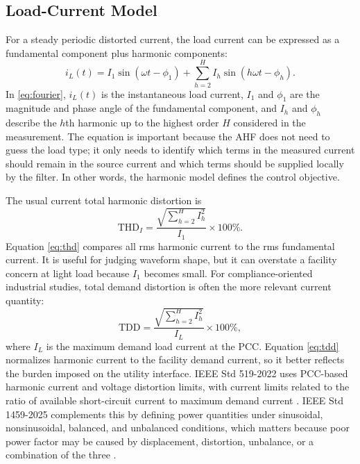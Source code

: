 \documentclass[conference]{IEEEtran}
\newcommand{\THD}{\mathrm{THD}}
\newcommand{\TDD}{\mathrm{TDD}}
\begin{document}
\subsection{Load-Current Model}
For a steady periodic distorted current, the load current can be expressed as a fundamental component plus harmonic components:
\begin{equation}
i_L(t)=I_1\sin(\omega t-\phi_1)+\sum_{h=2}^{H} I_h\sin(h\omega t-\phi_h).
\label{eq:fourier}
\end{equation}
In \eqref{eq:fourier}, $i_L(t)$ is the instantaneous load current, $I_1$ and $\phi_1$ are the magnitude and phase angle of the fundamental component, and $I_h$ and $\phi_h$ describe the $h$th harmonic up to the highest order $H$ considered in the measurement. The equation is important because the AHF does not need to guess the load type; it only needs to identify which terms in the measured current should remain in the source current and which terms should be supplied locally by the filter. In other words, the harmonic model defines the control objective.

The usual current total harmonic distortion is
\begin{equation}
\THD_I=\frac{\sqrt{\sum_{h=2}^{H} I_h^2}}{I_1}\times100\%.
\label{eq:thd}
\end{equation}
Equation \eqref{eq:thd} compares all rms harmonic current to the rms fundamental current. It is useful for judging waveform shape, but it can overstate a facility concern at light load because $I_1$ becomes small. For compliance-oriented industrial studies, total demand distortion is often the more relevant current quantity:
\begin{equation}
\TDD=\frac{\sqrt{\sum_{h=2}^{H} I_h^2}}{I_L}\times100\%,
\label{eq:tdd}
\end{equation}
where $I_L$ is the maximum demand load current at the PCC. Equation \eqref{eq:tdd} normalizes harmonic current to the facility demand current, so it better reflects the burden imposed on the utility interface. IEEE Std 519-2022 uses PCC-based harmonic current and voltage distortion limits, with current limits related to the ratio of available short-circuit current to maximum demand current \cite{IEEE5192022}. IEEE Std 1459-2025 complements this by defining power quantities under sinusoidal, nonsinusoidal, balanced, and unbalanced conditions, which matters because poor power factor may be caused by displacement, distortion, unbalance, or a combination of the three \cite{IEEE14592025}.
\end{document}
